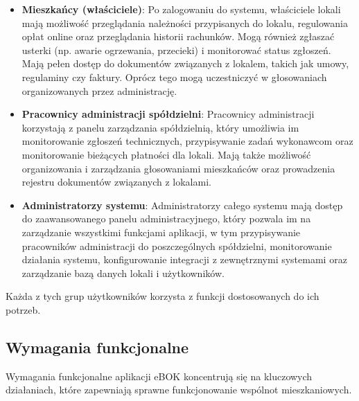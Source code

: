 \begin{itemize} 

	\item \textbf{Mieszkańcy (właściciele)}: Po zalogowaniu do systemu, właściciele lokali mają możliwość przeglądania należności przypisanych do lokalu, regulowania opłat online oraz przeglądania historii rachunków. Mogą również zgłaszać usterki (np. awarie ogrzewania, przecieki) i monitorować status zgłoszeń. Mają pełen dostęp do dokumentów związanych z lokalem, takich jak umowy, regulaminy czy faktury. Oprócz tego mogą uczestniczyć w głosowaniach organizowanych przez administrację.
	
	\item \textbf{Pracownicy administracji spółdzielni}: Pracownicy administracji korzystają z panelu zarządzania spółdzielnią, który umożliwia im monitorowanie zgłoszeń technicznych, przypisywanie zadań wykonawcom oraz monitorowanie bieżących płatności dla lokali. Mają także możliwość organizowania i zarządzania głosowaniami mieszkańców oraz prowadzenia rejestru dokumentów związanych z lokalami.

	\item \textbf{Administratorzy systemu}: Administratorzy całego systemu mają dostęp do zaawansowanego panelu administracyjnego, który pozwala im na zarządzanie wszystkimi funkcjami aplikacji, w tym przypisywanie pracowników administracji do poszczególnych spółdzielni, monitorowanie działania systemu, konfigurowanie integracji z zewnętrznymi systemami oraz zarządzanie bazą danych lokali i użytkowników.

\end{itemize}

Każda z tych grup użytkowników korzysta z funkcji dostosowanych do ich potrzeb.

\subsection{Wymagania funkcjonalne}

Wymagania funkcjonalne aplikacji eBOK koncentrują się na kluczowych działaniach, które zapewniają sprawne funkcjonowanie wspólnot mieszkaniowych.

